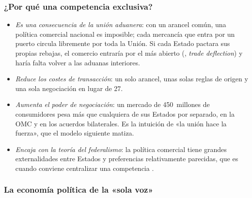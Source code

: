 \documentclass[11pt]{article}
\begin{document}
\subsubsection{¿Por qué una competencia exclusiva?}\label{sec:exclusiva}

\begin{itemize}
\item \emph{Es una consecuencia de la unión aduanera}: con un arancel común, una política comercial nacional es imposible; cada mercancía que entra por un puerto circula libremente por toda la Unión. Si cada Estado pactara sus propias rebajas, el comercio entraría por el más abierto (, \emph{trade deflection}) y haría falta volver a las aduanas interiores.
\item \emph{Reduce los costes de transacción}: un solo arancel, unas solas reglas de origen y una sola negociación en lugar de 27.
\item \emph{Aumenta el poder de negociación}: un mercado de 450~millones de consumidores pesa más que cualquiera de sus Estados por separado, en la OMC y en los acuerdos bilaterales. Es la intuición de «la unión hace la fuerza», que el modelo siguiente matiza.
\item \emph{Encaja con la teoría del federalismo}: la política comercial tiene grandes externalidades entre Estados y preferencias relativamente parecidas, que es cuando conviene centralizar una competencia  .
\end{itemize}

\subsubsection{La economía política de la «sola voz»}\label{sec:meunier}
\end{document}
